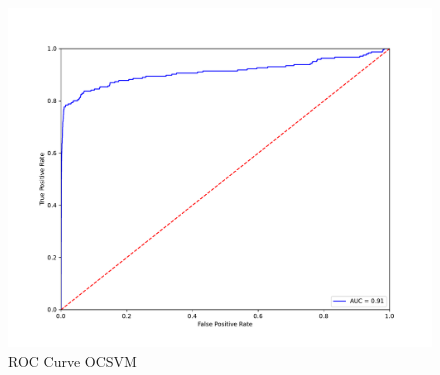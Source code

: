 \begin{figure}[!htb]
    \begin{minipage}[t]{1\textwidth}
       \centering
        \includegraphics[width=\textwidth]{images/ocsvm-roc.pdf}
        \caption{ROC Curve OCSVM}
    \end{minipage}
    
\end{figure}

\noindent